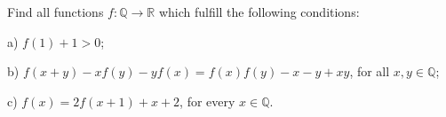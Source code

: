 Find all functions $f: \mathbb{Q}\to\mathbb{R}$ which fulfill the following conditions:

a) $f(1)+1>0$;

b) $f(x+y) -xf(y) -yf(x) = f(x)f(y) -x-y +xy$,  for all $x,y\in\mathbb{Q}$;

c) $f(x) = 2f(x+1) +x+2$,  for every $x\in\mathbb{Q}$.